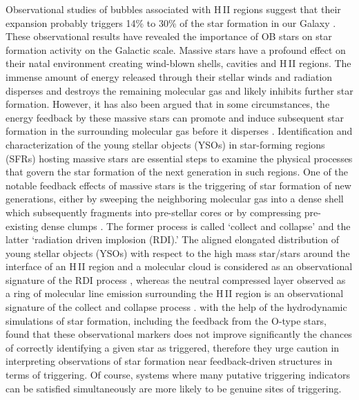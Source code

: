 \documentclass[a4paper,fleqn,usenatbib,useAMS]{mnras}
\begin{document}
Observational studies of bubbles associated with H\,{\sevensize II} 
regions suggest that their expansion probably triggers 14\% to 30\% of 
the star formation in our Galaxy \citep[e.g.,][]{2010A&A...523A...6D,2012MNRAS.421..408T,2012ApJ...755...71K}.
These observational results have revealed the importance of 
OB stars on star formation activity on the Galactic scale. 
Massive stars have a profound effect on their natal environment
creating wind-blown shells, cavities and  H\,{\sevensize II} regions. The immense
amount of energy released through their stellar winds and radiation 
disperses and destroys the remaining molecular gas and likely
inhibits further star formation. However, it has also been argued
that in some circumstances, the energy feedback by these massive stars
can promote and induce subsequent star formation in the
surrounding molecular gas before it disperses \citep{2012ApJ...744..130K}.
Identification and characterization of the young stellar objects (YSOs) in 
star-forming regions (SFRs) hosting massive stars are essential steps to examine the
physical processes that govern the star formation of the next generation in such regions.
One of the notable feedback effects of massive stars is
the triggering of star formation of new generations,
either by sweeping the neighboring molecular gas into a
dense shell which subsequently fragments into pre-stellar cores 
\citep[e.g.,][]{1977ApJ...214..725E,1994MNRAS.268..291W,1998ASPC..148..150E}
or by compressing pre-existing dense clumps 
\citep[e.g.,][]{1982ApJ...260..183S,1989ApJ...346..735B,1994A&A...289..559L}.
The former process is called `collect and collapse' and the latter 
`radiation driven implosion (RDI).'
The aligned elongated distribution of young stellar objects (YSOs) 
 with respect to the high mass star/stars
around the interface of an H\,{\sevensize II}  region and a molecular cloud is 
considered as an observational signature of the RDI process 
\citep{2002AJ....123.2597O,2005ApJ...624..808L},
whereas the neutral compressed layer  observed as a ring of molecular
line emission surrounding the  H\,{\sevensize II} region
is an observational signature of the collect and collapse process \citep[for details, cf.][]{2005A&A...433..565D}.
\citet{2015MNRAS.450.1199D} with the help of the  hydrodynamic simulations of star formation, 
including the feedback from the O-type stars, found that these observational markers 
 does not improve significantly the chances of correctly identifying a given star as triggered,
therefore  they urge caution in interpreting observations of star formation near feedback-driven structures in terms of triggering. Of course, systems where many putative triggering indicators can be satisfied simultaneously are more likely to be genuine sites of triggering.
\end{document}
